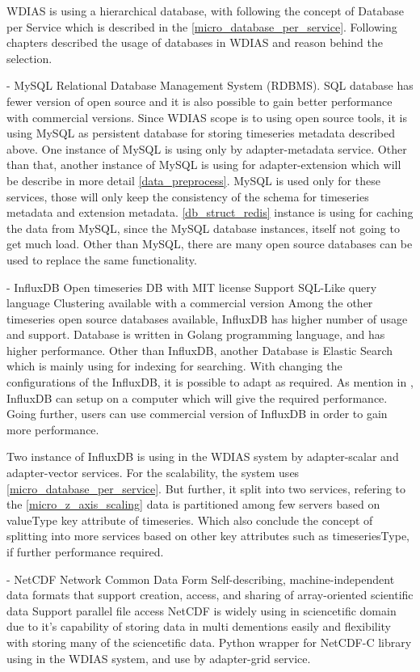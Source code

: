 WDIAS is using a hierarchical database, with following the concept of Database per Service which is described in the \ref{micro_database_per_service}.
Following chapters described the usage of databases in WDIAS and reason behind the selection.

- MySQL
Relational Database Management System (RDBMS).
SQL database has fewer version of open source and it is also possible to gain better performance with commercial versions. 
Since WDIAS scope is to using open source tools, it is using MySQL as persistent database for storing timeseries metadata described above.
One instance of MySQL is using only by adapter-metadata service.
Other than that, another instance of MySQL is using for adapter-extension which will be describe in more detail \ref{data_preprocess}.
MySQL is used only for these services, those will only keep the consistency of the schema for timeseries metadata and extension metadata.
\ref{db_struct_redis} instance is using for caching the data from MySQL, since the MySQL database instances, itself not going to get much load.
Other than MySQL, there are many open source databases can be used to replace the same functionality.

- InfluxDB \cite{influxdbInfluxDBDocumentation}
Open timeseries DB with MIT license
Support SQL-Like query language
Clustering available with a commercial version
Among the other timeseries open source databases available, InfluxDB has higher number of usage and support. Database is written in Golang programming language,
and has higher performance. Other than InfluxDB, another Database is Elastic Search which is mainly using for indexing for searching.
With changing the configurations of the InfluxDB, it is possible to adapt as required. As mention in \cite{influxdbInfluxDBDocumentation}, 
InfluxDB can setup on a computer which will give the required performance. Going further, users can use commercial version of InfluxDB in order to gain more performance.

Two instance of InfluxDB is using in the WDIAS system by adapter-scalar and adapter-vector services. For the scalability, the system uses \ref{micro_database_per_service}.
But further, it split into two services, refering to the \ref{micro_z_axis_scaling} data is partitioned among few servers based on valueType key attribute of timeseries.
Which also conclude the concept of splitting into more services based on other key attributes such as timeseriesType, if further performance required.

- NetCDF \cite{unidataUnidataNetCDF}
Network Common Data Form
Self-describing, machine-independent data formats that support creation, access, and sharing of array-oriented scientific data
Support parallel file access
NetCDF is widely using in sciencetific domain due to it's capability of storing data in multi dementions easily and flexibility with storing many of the sciencetific data.
Python wrapper for NetCDF-C library using in the WDIAS system, and use by adapter-grid service.

